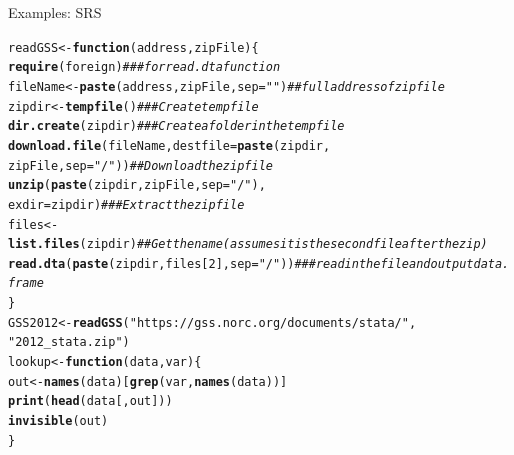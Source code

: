 \documentclass[10pt]{beamer}\usepackage[]{graphicx}\usepackage[]{xcolor}
\makeatletter
\newcommand{\hlnum}[1]{\textcolor[rgb]{0.686,0.059,0.569}{#1}}%
\newcommand{\hlstr}[1]{\textcolor[rgb]{0.192,0.494,0.8}{#1}}%
\newcommand{\hlcom}[1]{\textcolor[rgb]{0.678,0.584,0.686}{\textit{#1}}}%
\newcommand{\hlstd}[1]{\textcolor[rgb]{0.345,0.345,0.345}{#1}}%
\newcommand{\hlkwa}[1]{\textcolor[rgb]{0.161,0.373,0.58}{\textbf{#1}}}%
\newcommand{\hlkwb}[1]{\textcolor[rgb]{0.69,0.353,0.396}{#1}}%
\newcommand{\hlkwc}[1]{\textcolor[rgb]{0.333,0.667,0.333}{#1}}%
\newcommand{\hlkwd}[1]{\textcolor[rgb]{0.737,0.353,0.396}{\textbf{#1}}}%
\newenvironment{kframe}{%
 \def\at@end@of@kframe{}%
 \ifinner\ifhmode%
  \def\at@end@of@kframe{\end{minipage}}%
  \begin{minipage}{\columnwidth}%
 \fi\fi%
 \def\FrameCommand##1{\hskip\@totalleftmargin \hskip-\fboxsep
 \colorbox{shadecolor}{##1}\hskip-\fboxsep
     \hskip-\linewidth \hskip-\@totalleftmargin \hskip\columnwidth}%
 \MakeFramed {\advance\hsize-\width
   \@totalleftmargin\z@ \linewidth\hsize
   \@setminipage}}%
 {\par\unskip\endMakeFramed%
 \at@end@of@kframe}
\newenvironment{knitrout}{}{} %
\makeatother
\begin{document}
\begin{frame}[containsverbatim]{Examples: SRS}
\tiny
\begin{knitrout}
\color{fgcolor}\begin{kframe}
\begin{alltt}
\hlstd{readGSS} \hlkwb{<-} \hlkwa{function}\hlstd{(}\hlkwc{address}\hlstd{,} \hlkwc{zipFile}\hlstd{) \{}
    \hlkwd{require}\hlstd{(foreign)}  \hlcom{### for read.dta function}
    \hlstd{fileName} \hlkwb{<-} \hlkwd{paste}\hlstd{(address, zipFile,} \hlkwc{sep} \hlstd{=} \hlstr{""}\hlstd{)}  \hlcom{##full address of zip file}
    \hlstd{zipdir} \hlkwb{<-} \hlkwd{tempfile}\hlstd{()}  \hlcom{### Create temp file}
    \hlkwd{dir.create}\hlstd{(zipdir)}  \hlcom{### Create a folder in the temp file}
    \hlkwd{download.file}\hlstd{(fileName,} \hlkwc{destfile} \hlstd{=} \hlkwd{paste}\hlstd{(zipdir,}
        \hlstd{zipFile,} \hlkwc{sep} \hlstd{=} \hlstr{"/"}\hlstd{))}  \hlcom{## Download the zip file}
    \hlkwd{unzip}\hlstd{(}\hlkwd{paste}\hlstd{(zipdir, zipFile,} \hlkwc{sep} \hlstd{=} \hlstr{"/"}\hlstd{),}
        \hlkwc{exdir} \hlstd{= zipdir)}  \hlcom{### Extract the zip file}
    \hlstd{files} \hlkwb{<-} \hlkwd{list.files}\hlstd{(zipdir)}  \hlcom{## Get the name (assumes it is the second file after the zip)}
    \hlkwd{read.dta}\hlstd{(}\hlkwd{paste}\hlstd{(zipdir, files[}\hlnum{2}\hlstd{],} \hlkwc{sep} \hlstd{=} \hlstr{"/"}\hlstd{))}  \hlcom{### read in the file and output data.frame}
\hlstd{\}}
\hlstd{GSS2012} \hlkwb{<-} \hlkwd{readGSS}\hlstd{(}\hlstr{"https://gss.norc.org/documents/stata/"}\hlstd{,}
    \hlstr{"2012_stata.zip"}\hlstd{)}
\hlstd{lookup} \hlkwb{<-} \hlkwa{function}\hlstd{(}\hlkwc{data}\hlstd{,} \hlkwc{var}\hlstd{) \{}
    \hlstd{out} \hlkwb{<-} \hlkwd{names}\hlstd{(data)[}\hlkwd{grep}\hlstd{(var,} \hlkwd{names}\hlstd{(data))]}
    \hlkwd{print}\hlstd{(}\hlkwd{head}\hlstd{(data[, out]))}
    \hlkwd{invisible}\hlstd{(out)}
\hlstd{\}}
\end{alltt}
\end{kframe}
\end{knitrout}
\end{frame}
\end{document}
